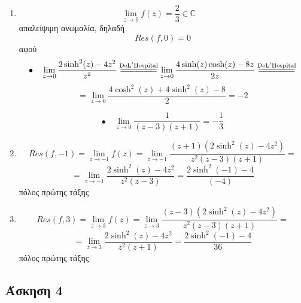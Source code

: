 \documentclass[12pt]{article}
\begin{document}
\begin{enumerate}

\item
$$ \lim_{z\to 0}f(z)=  \frac{2}{3}\in\mathbb{C} \quad $$ απαλείψιμη ανωμαλία, δηλαδή
$$ Res(f,0)=0 $$
αφού
$$ \bullet \quad \lim_{z\to 0}\frac{2\sinh^2(z)-4z^2}{z^2}\overset{\mathrm{De L'Hospital}}{=\joinrel=\joinrel=\joinrel=\joinrel=\joinrel=\joinrel=}
\lim_{z\to 0}\frac{4\sinh(z)\cosh(z)-8z}{2z}\overset{\mathrm{De L'Hospital}}{=\joinrel=\joinrel=\joinrel=\joinrel=\joinrel=\joinrel=}$$ 
$$=\lim_{z\to 0}\frac{4\cosh^2(z)+4\sinh^2(z)-8}{2}=-2$$

$$ \bullet \quad \lim_{z\to 0} \frac{1}{(z-3)(z+1)}=-\frac{1}{3} $$

\item
$$ Res(f,-1)= \lim_{z\to -1}f(z)=\lim_{z\to -1}\frac{(z+1)(2\sinh^2(z)-4z^2)}{z^2(z-3)(z+1)} =$$
$$=\lim_{z\to -1}\frac{2\sinh^2(z)-4z^2}{z^2(z-3)}=\frac{2\sinh^2(-1)-4}{(-4)} $$ πόλος πρώτης τάξης

\item
$$ Res(f,3)= \lim_{z\to 3}f(z)=\lim_{z\to 3}\frac{(z-3)(2\sinh^2(z)-4z^2)}{z^2(z-3)(z+1)}= $$
$$=\lim_{z\to 3}\frac{2\sinh^2(z)-4z^2}{z^2(z+1)}=\frac{2\sinh^2(-1)-4}{36} $$ πόλος πρώτης τάξης

\end{enumerate}

\newpage
 \subsection{Άσκηση 4}
\end{document}
